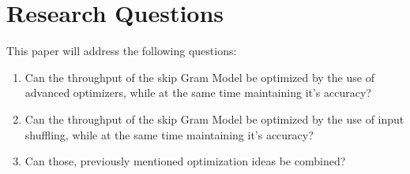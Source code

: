 \chapter{Research Questions}\label{chap:questions}

This paper will address the following questions: 
\begin{enumerate}
\item Can the throughput of the skip Gram Model be optimized by the use of advanced optimizers, while at the same time maintaining it's accuracy? 
\item Can the throughput of the skip Gram Model be optimized by the use of input shuffling, while at the same time maintaining it's accuracy? 
\item Can those, previously mentioned optimization ideas be combined? 
\end{enumerate}

